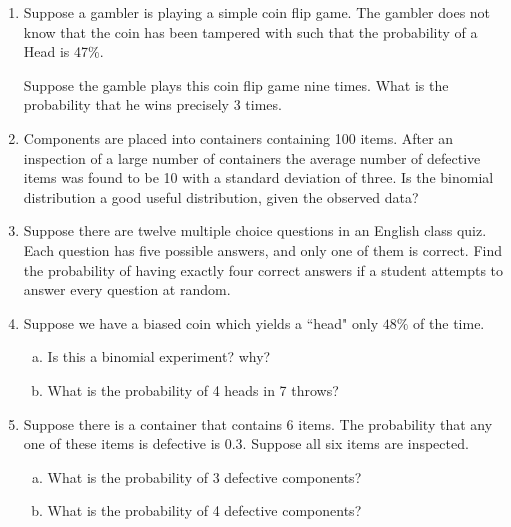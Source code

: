 \documentclass[a4paper,12pt]{article}
\begin{document}
\begin{enumerate}
\begin{enumerate}[(a)]
\begin{multicols}{2}
\begin{enumerate}[(i)]
	\item $X \sim Bin(n = 10, p = 0.40)$
	\item $X \sim Bin(n = 15, p = 0.25)$
	\item $X \sim Bin(n = 20, p = 0.30)$
	\item $X \sim Bin(n = 50, p = 0.20)$
	\item $X \sim Bin(n = 200, p = 0.10)$
	\item $X \sim Bin(n = 1000, p = 0.01)$
\end{enumerate}
\end{multicols}
\end{enumerate}

\item 
Suppose a gambler is playing a simple coin flip game. 
The gambler does not know that the coin has been tampered with such that the probability of a Head is 47\%.

Suppose the gamble plays this coin flip game nine times. 
What is the probability that he wins precisely 3 times.

\item Components are placed into containers containing 100 items. After an inspection of a large number of containers the average number of defective items was found to be 10 with a standard deviation of three.
Is the binomial distribution a good useful distribution, given the observed data?


	
\item Suppose there are twelve multiple choice questions in an English class quiz. Each question has five possible answers, and only one of them is correct. Find the probability of having exactly four correct answers if a student attempts to answer every question at random.	
	
	\item Suppose we have a biased coin which yields a ``head" only $48\%$ of the time.
\begin{enumerate}[(a)]
	

	\item Is this a binomial experiment?  why?
	\item What is the probability of 4 heads in 7 throws?

\end{enumerate}
\item Suppose there is a container that contains 6 items.  The probability that any one of these items is defective is 0.3. Suppose all six items are inspected. 
	\begin{enumerate}[(a)]
		\item What is the probability of 3 defective components?
		\item What is the probability of 4 defective components?
	\end{enumerate}
	

\end{enumerate}
\end{document}
